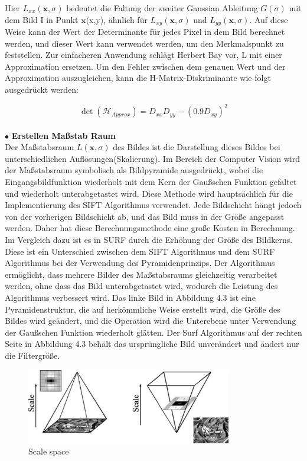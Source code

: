 Hier $L_{xx}(\textbf{x},\sigma)$ bedeutet die Faltung der zweiter Gaussian Ableitung $G(\sigma)$ mit dem Bild I in Punkt $\textbf{x}$(x,y), ähnlich für $L_{xy}(\textbf{x},\sigma)$ und $L_{yy}(\textbf{x},\sigma)$. Auf diese Weise kann der Wert der Determinante für jedes Pixel in dem Bild berechnet werden, und dieser Wert kann verwendet werden, um den Merkmalspunkt zu feststellen.
Zur einfacheren Anwendung schlägt Herbert Bay\cite{Surf} vor, L mit einer Approximation ersetzen. Um den Fehler zwischen dem genauen Wert und der Approximation auszugleichen, kann die H-Matrix-Diskriminante wie folgt ausgedrückt werden:

\begin{equation}
   \det(\mathcal{H}_{Approx}) = D_{xx}D_{yy} - (0.9D_{xy})^2  
\end{equation}
\\
$\bullet$ \textbf{Erstellen Maßstab Raum}\\
Der Maßstabsraum $L(\textbf{x},\sigma)$ des Bildes ist die Darstellung dieses Bildes bei unterschiedlichen Auflösungen(Skalierung). Im Bereich der Computer Vision wird der Maßstabsraum symbolisch als Bildpyramide ausgedrückt, wobei die Eingangsbildfunktion wiederholt mit dem Kern der Gaußschen Funktion gefaltet und wiederholt unterabgetastet wird. Diese Methode wird hauptsächlich für die Implementierung des SIFT Algorithmus verwendet. Jede Bildschicht hängt jedoch von der vorherigen Bildschicht ab, und das Bild muss in der Größe angepasst werden. Daher hat diese Berechnungsmethode eine große Kosten in Berechnung. Im Vergleich dazu ist es in SURF durch die Erhöhung der Größe des Bildkerns. Diese ist ein Unterschied zwischen dem SIFT Algorithmus und dem SURF Algorithmus bei der Verwendung des Pyramidenprinzips.
Der Algorithmus ermöglicht, dass mehrere Bilder des Maßstabsraums gleichzeitig verarbeitet werden, ohne dass das Bild unterabgetastet wird, wodurch die Leistung des Algorithmus verbessert wird. Das linke Bild in Abbildung 4.3 ist eine Pyramidenstruktur, die auf herkömmliche Weise erstellt wird, die Größe des Bildes wird geändert, und die Operation wird die Unterebene  unter Verwendung der Gaußschen Funktion wiederholt glätten. Der Surf Algorithmus auf der rechten Seite in Abbildung 4.3 behält das ursprüngliche Bild unverändert und ändert nur die Filtergröße.

\begin{figure}[htb]
 \centering 
 \includegraphics[keepaspectratio,width=0.8\textwidth]{images/4_ZweiteErfahrung/Scale_space.pdf}
 \caption{Scale space}
 \label{fig:Scale space}
\end{figure} 



